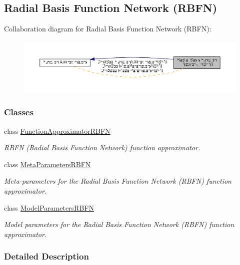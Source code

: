 \hypertarget{group__RBFN}{\subsection{Radial Basis Function Network (R\+B\+F\+N)}
\label{group__RBFN}
}
Collaboration diagram for Radial Basis Function Network (R\+B\+F\+N)\+:
\nopagebreak
\begin{figure}[H]
\begin{center}
\leavevmode
\includegraphics[width=350pt]{group__RBFN}
\end{center}
\end{figure}
\subsubsection*{Classes}
\begin{DoxyCompactItemize}
\item 
class \hyperlink{classDmpBbo_1_1FunctionApproximatorRBFN}{Function\+Approximator\+R\+B\+F\+N}
\begin{DoxyCompactList}\small\item\em R\+B\+F\+N (Radial Basis Function Network) function approximator. \end{DoxyCompactList}\item 
class \hyperlink{classDmpBbo_1_1MetaParametersRBFN}{Meta\+Parameters\+R\+B\+F\+N}
\begin{DoxyCompactList}\small\item\em Meta-\/parameters for the Radial Basis Function Network (R\+B\+F\+N) function approximator. \end{DoxyCompactList}\item 
class \hyperlink{classDmpBbo_1_1ModelParametersRBFN}{Model\+Parameters\+R\+B\+F\+N}
\begin{DoxyCompactList}\small\item\em Model parameters for the Radial Basis Function Network (R\+B\+F\+N) function approximator. \end{DoxyCompactList}\end{DoxyCompactItemize}


\subsubsection{Detailed Description}
